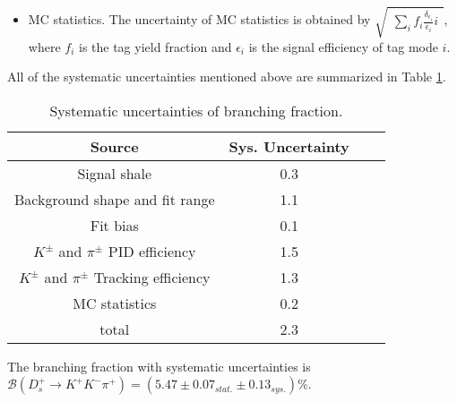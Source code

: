 {\begin{itemize}
    \item MC statistics. The uncertainty of MC statistics is obtained by $\sqrt{ \begin{matrix} \sum_{i} f_{i}\frac{\delta_{\epsilon_{i}}}{\epsilon_{i}}i\end{matrix}}$, where $f_{i}$ is the tag yield fraction and $\epsilon_{i}$ is the signal efficiency of tag mode $i$.
    \end{itemize}

    All of the systematic uncertainties mentioned above are summarized in Table \ref{BF-Sys}.
    \begin{table}[htbp]
        \caption{Systematic uncertainties of branching fraction.}
        \label{BF-Sys}
        \begin{center}
            \begin{tabular}{cccc}
                \toprule\toprule
                Source   & Sys. Uncertainty\\
                \hline
                Signal shale                        & 0.3 \\
                Background shape and fit range      & 1.1 \\
                Fit bias                            & 0.1 \\
                $K^{\pm}$ and $\pi^{\pm}$ PID efficiency            & 1.5 \\
                $K^{\pm}$ and $\pi^{\pm}$ Tracking efficiency       & 1.3 \\
                MC statistics                       & 0.2 \\
                \hline
                total                               & 2.3 \\
                \bottomrule\bottomrule
            \end{tabular}
        \end{center}
    \end{table}

    The branching fraction with systematic uncertainties is $\mathcal{B}(D_{s}^{+} \rightarrow K^{+}K^{-}\pi^{+})=(5.47\pm0.07_{stat.}\pm0.13_{sys.})\%$.




}
